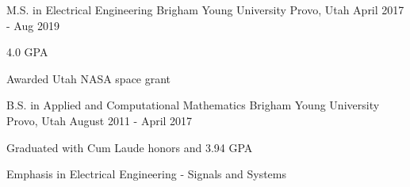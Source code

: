 

\begin{cventries}

  \cventry
    {M.S. in Electrical Engineering} %
    {Brigham Young University} %
    {Provo, Utah} %
    {April 2017 - Aug 2019} %
    {
      \begin{cvitems}
      \item {4.0 GPA}
      \item {Awarded Utah NASA space grant}
      \end{cvitems}
    }

  \cventry
    {B.S. in Applied and Computational Mathematics} %
    {Brigham Young University} %
    {Provo, Utah} %
    {August 2011 - April 2017} %
    {
      \begin{cvitems} %
        \item {Graduated with Cum Laude honors and 3.94 GPA}
        \item {Emphasis in Electrical Engineering - Signals and Systems}
      \end{cvitems}
    }

\end{cventries}
